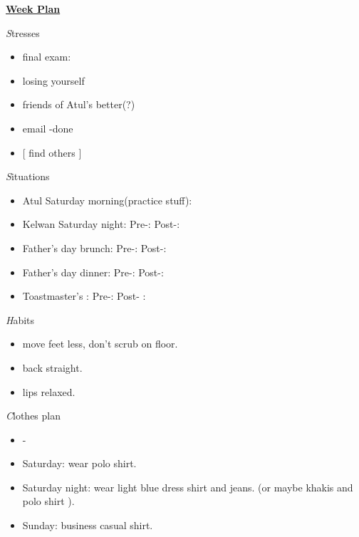 \documentclass[serif,mathserif,final]{beamer}
\begin{document}
\begin{frame}{}
\begin{columns}[t]
\begin{column}{0.27\linewidth} {\textbf{\underline{Week Plan}}} 

  \begin{block}{\textit Stresses} 
    \begin{itemize}
   \small \item \small final exam: 
   \item \small losing yourself
   \item \small friends of Atul's better(?)
   \item \small email -done  
   \item \small [ find others ]
    \end{itemize} 
  \end{block} 

  \begin{block}{\textit Situations} 
    \begin{itemize} 
    \small \item \small Atul Saturday morning(practice stuff): 
    \item \small Kelwan Saturday night: Pre-: Post-: 
    \item \small Father's day brunch: Pre-: Post-: 
      \item \small Father's day dinner: Pre-: Post-: 
      \item \small Toastmaster's : Pre-:  Post- :  
    \end{itemize} 
  \end{block} 

  \begin{block}{\textit Habits } 
    \begin{itemize} 
      \small \item \small move feet less, don't scrub on floor. 
    \item \small back straight. 
    \item \small lips relaxed. 
    \end{itemize} 
  \end{block} 

  \begin{block}{\textit Clothes plan } 
    \begin{itemize} 
      \small \item \small - 
    \item \small Saturday: wear polo shirt. 
      \item \small Saturday night: wear light blue dress shirt and jeans. (or maybe khakis and polo shirt ).  
      \item \small Sunday: business casual shirt. 
    \end{itemize} 
  \end{block} 


\end{column}
\end{columns}
\end{frame}
\end{document}
